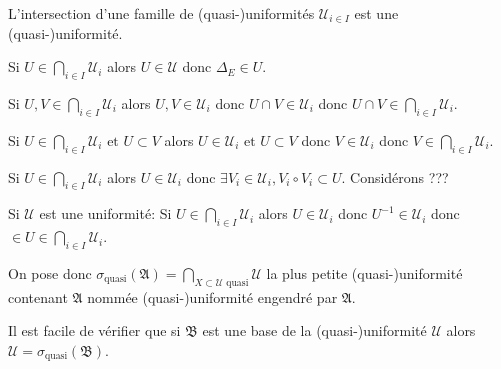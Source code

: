 \documentclass[a4paper, 11pt, french]{book}
\newenvironment{itemise}{\itemize}{\enditemize}
\theoremstyle{plain} %
\theoremstyle{definition} %
\theoremstyle{remark} %
\newcommand{\1}{\mathds{1}}
\newcommand{\inv}[1]{#1^{-1}}
\newcommand\et{\text{ et }}
\begin{document}
\proposition
L'intersection d'une famille de (quasi-)uniformités $\mathscr{U}_{i\in I}$ est une (quasi-)uniformité.
\demonstration
\begin{itemise}
	\item Si $U\in\bigcap_{i\in I}\mathscr{U}_i$ alors $U\in\mathscr{U}$ donc $\Delta_E\in U$.
	\item Si $U, V\in\bigcap_{i\in I}\mathscr{U}_i$ alors $U, V\in\mathscr{U}_i$ donc $U\cap V\in\mathscr{U}_i$ donc $U\cap V\in\bigcap_{i\in I}\mathscr{U}_i$.
	\item Si $U\in\bigcap_{i\in I}\mathscr{U}_i\et U\subset V$ alors $U\in\mathscr{U}_i\et U\subset V$ donc $V\in\mathscr{U}_i$ donc $V\in\bigcap_{i\in I}\mathscr{U}_i$.
	\item Si $U\in\bigcap_{i\in I}\mathscr{U}_i$ alors $U\in\mathscr{U}_i$ donc $\exists V_i\in\mathscr{U}_i, V_i\circ V_i\subset U$.
	Considérons {\color{red} ???}
	\item Si $\mathscr{U}$ est une uniformité: Si $U\in\bigcap_{i\in I}\mathscr{U}_i$ alors $U\in\mathscr{U}_i$ donc $\inv{U}\in\mathscr{U}_i$ donc $\in{U}\in\bigcap_{i\in I}\mathscr{U}_i$.
\end{itemise}

On pose donc $\sigma_\text{quasi}(\mathfrak{A})=\bigcap_{X\subset\mathscr{U}\text{ quasi}}\mathscr{U}$ la plus petite (quasi-)uniformité contenant $\mathfrak{A}$ nommée (quasi-)uniformité engendré par $\mathfrak{A}$.

\remarque
Il est facile de vérifier que si $\mathfrak{B}$ est une base de la (quasi-)uniformité $\mathscr{U}$ alors $\mathscr{U}=\sigma_\text{quasi}(\mathfrak{B})$.
\end{document}
